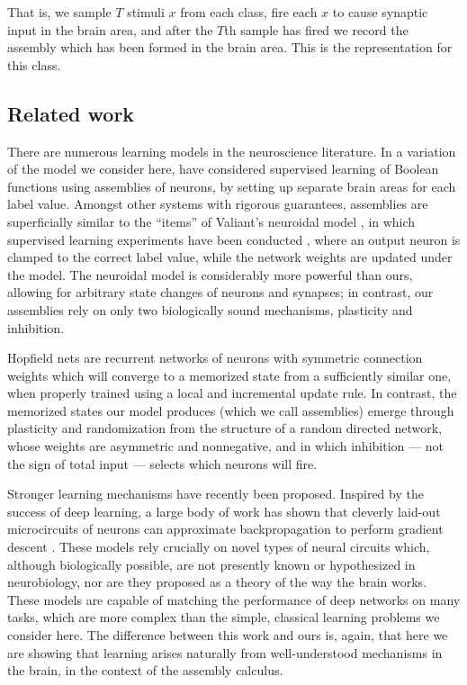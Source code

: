 \documentclass[final,12pt]{colt2022} %
\begin{document}
That is, we sample $T$ stimuli $x$ from each class, fire each $x$ to cause synaptic input in the brain area, and after the $T$th sample has fired we record the assembly which has been formed in the brain area.  This is the representation for this class.

\subsection*{Related work}
There are numerous learning models in the neuroscience literature. 
In a variation of the model we consider here, \citet{RangamaniGandhi2020} have considered supervised learning of Boolean functions using assemblies of neurons, by setting up separate brain areas for each label value.
Amongst other systems with rigorous guarantees, assemblies are superficially similar to the ``items'' of Valiant's neuroidal model \citep{Valiant94}, in which supervised learning experiments have been conducted \citep{Valiant00, FeldmanV09}, where an output neuron is clamped to the correct label value, while the network weights are updated under the model. The neuroidal model is considerably more powerful than ours, allowing for arbitrary state changes of neurons and synapses; in contrast, our assemblies rely on only two biologically sound mechanisms, plasticity and inhibition. 

Hopfield nets \citep{hopfield1982neural} are recurrent networks of neurons with symmetric connection weights which will converge to a memorized state from a sufficiently similar one, when properly trained using a local and incremental update rule.  In contrast, the memorized states our model produces (which we call assemblies) emerge through plasticity and randomization from the structure of a random directed network, whose weights are asymmetric and nonnegative, and in which inhibition --- not the sign of total input --- selects which neurons will fire. 

Stronger learning mechanisms have recently been proposed. Inspired by the success of deep learning, a large body of work has shown that cleverly laid-out microcircuits of neurons can approximate backpropagation to perform gradient descent \citep{Lillicrap2016RandomSF, sacramento2017dendritic, guerguiev2017towards, sacramento2018dendritic, whittington2019theories, lillicrap2020}. These models rely crucially on novel types of neural circuits which, although biologically possible, are not presently known or hypothesized in neurobiology, nor are they proposed as a theory of the way the brain works. These models are capable of matching the performance of deep networks on many tasks, which are more complex than the simple, classical learning problems we consider here. The difference between this work and ours is, again, that here we are showing that learning arises naturally from well-understood mechanisms in the brain, in the context of the assembly calculus.
\end{document}
